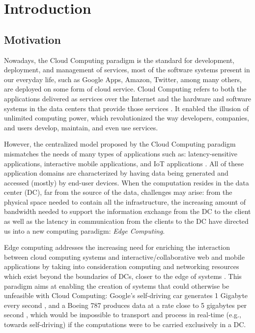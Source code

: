 


\chapter{Introduction}
\label{cha:introduction}



\section{Motivation}

Nowadays, the Cloud Computing paradigm is the standard for development, deployment, and management of services, most of the software systems present in our everyday life, such as Google Apps, Amazon, Twitter, among many others, are deployed on some form of cloud service. Cloud Computing refers to both the applications delivered as services over the Internet and the hardware and software systems in the data centers that provide those services \cite{10.1145/1721654.1721672}. It enabled the illusion of unlimited computing power, which revolutionized the way developers, companies, and users develop, maintain, and even use services.

However, the centralized model proposed by the Cloud Computing paradigm mismatches the needs of many types of applications  such as: latency-sensitive applications, interactive mobile applications, and IoT applications \cite{10.1145/3154815}. All of these application domains are characterized by having data being generated and accessed (mostly) by end-user devices. When the computation resides in the data center (DC), far from the source of the data, challenges may arise: from the physical space needed to contain all the infrastructure, the increasing amount of bandwidth needed to support the information exchange from the DC to the client as well as the latency in communication from the clients to the DC have directed us into a new computing paradigm: \textit{Edge Computing}.

Edge computing addresses the increasing need for enriching the interaction between cloud computing systems and interactive/collaborative web and mobile applications \cite{10.1145/242857.242867} by taking into consideration computing and networking resources which exist beyond the boundaries of DCs, closer to the edge of systems \cite{Leitao2018} \cite{7488250}. This paradigm aims at enabling the creation of systems that could otherwise be unfeasible with Cloud Computing: Google's self-driving car generates 1 Gigabyte every second \cite{datafloq}, and a Boeing 787 produces data at a rate close to 5 gigabytes per second \cite{finnegan_2013}, which would be impossible to transport and process in real-time (e.g., towards self-driving) if the computations were to be carried exclusively in a DC.


